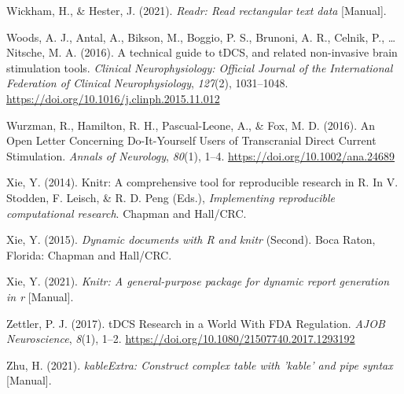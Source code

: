 \documentclass[
  man,floatsintext]{apa6}
\newlength{\cslhangindent}
\newlength{\cslentryspacingunit} %
\newenvironment{CSLReferences}[2] %
 {%
  \setlength{\parindent}{0pt}
  \ifodd #1
  \let\oldpar\par
  \def\par{\hangindent=\cslhangindent\oldpar}
  \fi
  \setlength{\parskip}{#2\cslentryspacingunit}
 }%
 {}
\begin{document}
\begin{CSLReferences}{1}{0}
\leavevmode{}%
Wickham, H., \& Hester, J. (2021). \emph{Readr: {Read} rectangular text data} {[}Manual{]}.

\leavevmode{}%
Woods, A. J., Antal, A., Bikson, M., Boggio, P. S., Brunoni, A. R., Celnik, P., \ldots{} Nitsche, M. A. (2016). A technical guide to {tDCS}, and related non-invasive brain stimulation tools. \emph{Clinical Neurophysiology: Official Journal of the International Federation of Clinical Neurophysiology}, \emph{127}(2), 1031--1048. \url{https://doi.org/10.1016/j.clinph.2015.11.012}

\leavevmode{}%
Wurzman, R., Hamilton, R. H., Pascual-Leone, A., \& Fox, M. D. (2016). An {Open Letter Concerning Do-It-Yourself Users} of {Transcranial Direct Current Stimulation}. \emph{Annals of Neurology}, \emph{80}(1), 1--4. \url{https://doi.org/10.1002/ana.24689}

\leavevmode{}%
Xie, Y. (2014). Knitr: {A} comprehensive tool for reproducible research in {R}. In V. Stodden, F. Leisch, \& R. D. Peng (Eds.), \emph{Implementing reproducible computational research}. {Chapman and Hall/CRC}.

\leavevmode{}%
Xie, Y. (2015). \emph{Dynamic documents with {R} and knitr} (Second). {Boca Raton, Florida}: {Chapman and Hall/CRC}.

\leavevmode{}%
Xie, Y. (2021). \emph{Knitr: {A} general-purpose package for dynamic report generation in r} {[}Manual{]}.

\leavevmode{}%
Zettler, P. J. (2017). {tDCS Research} in a {World With FDA Regulation}. \emph{AJOB Neuroscience}, \emph{8}(1), 1--2. \url{https://doi.org/10.1080/21507740.2017.1293192}

\leavevmode{}%
Zhu, H. (2021). \emph{{kableExtra}: {Construct} complex table with 'kable' and pipe syntax} {[}Manual{]}.

\end{CSLReferences}

\endgroup
\end{document}
